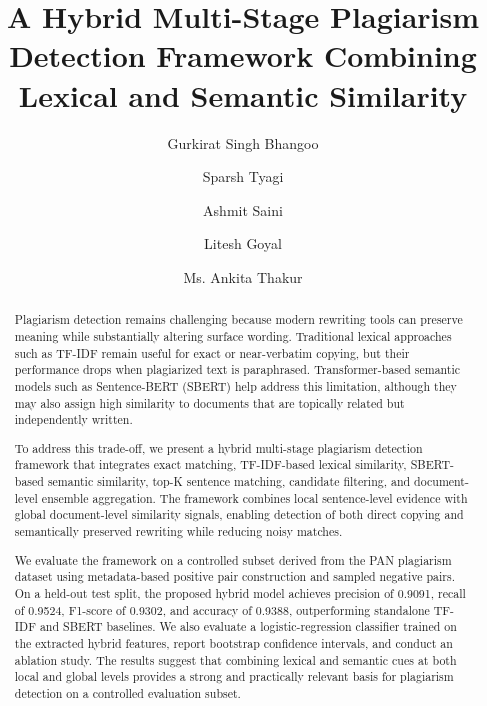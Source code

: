\documentclass{llncs}
\begin{document}
\title{A Hybrid Multi-Stage Plagiarism Detection Framework Combining Lexical and Semantic Similarity}

\author{Gurkirat Singh Bhangoo \and
Sparsh Tyagi \and
Ashmit Saini \and
Litesh Goyal \and
Ms. Ankita Thakur}


\maketitle

\begin{abstract}
Plagiarism detection remains challenging because modern rewriting tools can preserve meaning while substantially altering surface wording. Traditional lexical approaches such as TF-IDF remain useful for exact or near-verbatim copying, but their performance drops when plagiarized text is paraphrased. Transformer-based semantic models such as Sentence-BERT (SBERT) help address this limitation, although they may also assign high similarity to documents that are topically related but independently written.

To address this trade-off, we present a hybrid multi-stage plagiarism detection framework that integrates exact matching, TF-IDF-based lexical similarity, SBERT-based semantic similarity, top-K sentence matching, candidate filtering, and document-level ensemble aggregation. The framework combines local sentence-level evidence with global document-level similarity signals, enabling detection of both direct copying and semantically preserved rewriting while reducing noisy matches.

We evaluate the framework on a controlled subset derived from the PAN plagiarism dataset using metadata-based positive pair construction and sampled negative pairs. On a held-out test split, the proposed hybrid model achieves precision of 0.9091, recall of 0.9524, F1-score of 0.9302, and accuracy of 0.9388, outperforming standalone TF-IDF and SBERT baselines. We also evaluate a logistic-regression classifier trained on the extracted hybrid features, report bootstrap confidence intervals, and conduct an ablation study. The results suggest that combining lexical and semantic cues at both local and global levels provides a strong and practically relevant basis for plagiarism detection on a controlled evaluation subset.

\end{abstract}
\end{document}
